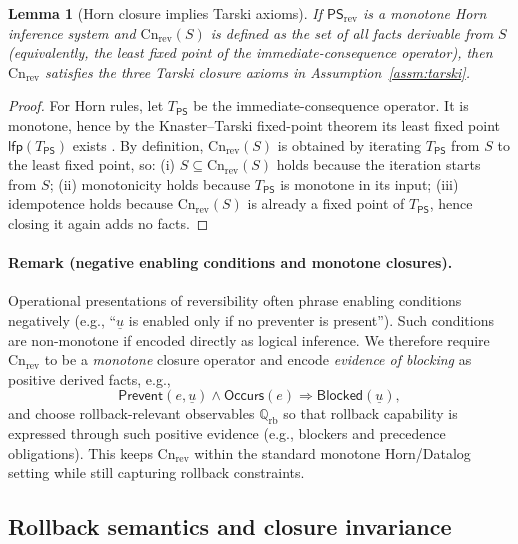 \documentclass[twoside]{article}
\newtheorem{lemma}[theorem]{Lemma}
\newcommand{\Cn}{\mathrm{Cn}}
\newcommand{\1}{\mathbf{1}}
\begin{document}
\begin{lemma}[Horn closure implies Tarski axioms]
\label{lem:horn-tarski}
If \(\mathsf{PS}_{\mathrm{rev}}\) is a monotone Horn inference system and \(\Cn_{\mathrm{rev}}(S)\) is defined as the set of all
facts derivable from \(S\) (equivalently, the least fixed point of the immediate-consequence operator),
then \(\Cn_{\mathrm{rev}}\) satisfies the three Tarski closure axioms in Assumption~\ref{assm:tarski}.
\end{lemma}

\begin{proof}
For Horn rules, let \(T_{\mathsf{PS}}\) be the immediate-consequence operator. It is monotone, hence by the Knaster--Tarski fixed-point theorem
its least fixed point \(\mathsf{lfp}(T_{\mathsf{PS}})\) exists \cite{tarski1955lattice}.
By definition, \(\Cn_{\mathrm{rev}}(S)\) is obtained by iterating \(T_{\mathsf{PS}}\) from \(S\) to the least fixed point, so:
(i) \(S\subseteq \Cn_{\mathrm{rev}}(S)\) holds because the iteration starts from \(S\);
(ii) monotonicity holds because \(T_{\mathsf{PS}}\) is monotone in its input;
(iii) idempotence holds because \(\Cn_{\mathrm{rev}}(S)\) is already a fixed point of \(T_{\mathsf{PS}}\), hence closing it again adds no facts.
\end{proof}

\paragraph{Remark (negative enabling conditions and monotone closures).}
Operational presentations of reversibility often phrase enabling conditions
negatively (e.g., ``\(\underline{u}\) is enabled only if no preventer is
present'').
Such conditions are non-monotone if encoded directly as logical inference.
We therefore require \(\Cn_{\mathrm{rev}}\) to be a \emph{monotone} closure
operator and encode \emph{evidence of blocking} as positive derived facts,
e.g.,
\[
\mathsf{Prevent}(e,\underline{u}) \wedge \mathsf{Occurs}(e)
\Rightarrow \mathsf{Blocked}(\underline{u}),
\]
and choose rollback-relevant observables \(\mathbb{Q}_{\mathrm{rb}}\) so that
rollback capability is expressed through such positive evidence (e.g., blockers
and precedence obligations).
This keeps \(\Cn_{\mathrm{rev}}\) within the standard monotone Horn/Datalog
setting while still capturing rollback constraints.

\subsection{Rollback semantics and closure invariance}
\label{sec:rollback-equiv}
\end{document}
